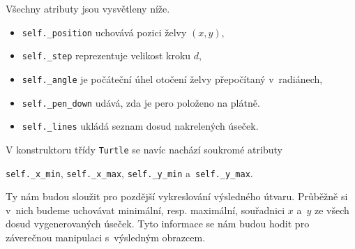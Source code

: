 Všechny atributy jsou vysvětleny níže.
\begin{itemize}
    \item \texttt{self.\_position} uchovává pozici želvy $(x,y)$,
    \item \texttt{self.\_step} reprezentuje velikost kroku $d$,
    \item \texttt{self.\_angle} je počáteční úhel otočení želvy přepočítaný v~radiánech,
    \item \texttt{self.\_pen\_down} udává, zda je pero položeno na plátně.
    \item \texttt{self.\_lines} ukládá seznam dosud nakrelených úseček.
\end{itemize}
V konstruktoru třídy \texttt{Turtle} se navíc nachází soukromé atributy
\begin{center}
    \texttt{self.\_x\_min}, \texttt{self.\_x\_max}, \texttt{self.\_y\_min} a~\texttt{self.\_y\_max}.
\end{center}
Ty nám budou sloužit pro pozdější vykreslování výsledného útvaru. Průběžně si v~nich budeme uchovávat minimální, resp. maximální, souřadnici $x$ a~$y$ ze všech dosud vygenerovaných úseček. Tyto informace se nám budou hodit pro záverečnou manipulaci s~výsledným obrazcem.


